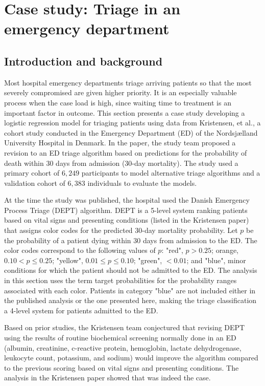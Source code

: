 \section{Case study: Triage in an emergency department}
\label{caseStudy}

\subsection{Introduction and background}
\label{section:IntroDanishED}

Most hospital emergency departments triage arriving patients so that the most severely compromised  are given higher priority. It is an especially valuable process when the case load is high, since waiting time to treatment is an important factor in outcome.  This section presents a case study developing a logistic regression model for triaging patients using data from Kristensen, et al., a cohort study conducted in the Emergency Department (ED) of the Nordsj{\ae}lland University Hospital in Denmark.  In the paper, the study team proposed a revision to an ED triage algorithm based on predictions for the probability of death within 30 days from admission (30-day mortality).  The study used a primary cohort of $6,249$ participants to model alternative triage algorithms and a validation cohort of $6,383$ individuals to evaluate the models.   


At the time the study was published, the hospital used the Danish Emergency Process Triage (DEPT) algorithm.  DEPT is a 5-level system ranking patients based on vital signs and presenting conditions (listed in the Kristensen paper) that assigns color codes for the predicted 30-day mortality probability.  Let $p$ be the probability of a patient dying within 30 days from admission to the ED\@.  The color codes correspond to the following values of $p$: "red", $p > 0.25$; orange, $0.10 < p \leq 0.25$; "yellow",  $0.01 \leq  p  \leq 0.10$; "green",  $ < 0.01$; and "blue", minor conditions for which the patient should not be admitted to the ED\@. The analysis in this section uses the term target probabilities for the probability ranges associated with each color. Patients in category "blue" are not included either in the published analysis or the one presented here, making the triage classification a 4-level system for patients admitted to the ED.

Based on prior studies, the Kristensen team conjectured that revising DEPT using  the results of routine biochemical screening normally done in an ED (albumin, creatinine, c-reactive protein, hemoglobin, lactate dehydrogenase, leukocyte count, potassium, and sodium) would improve the algorithm compared to the previous scoring based on vital signs and presenting conditions.  The analysis in the Kristensen paper showed that was indeed the case.

